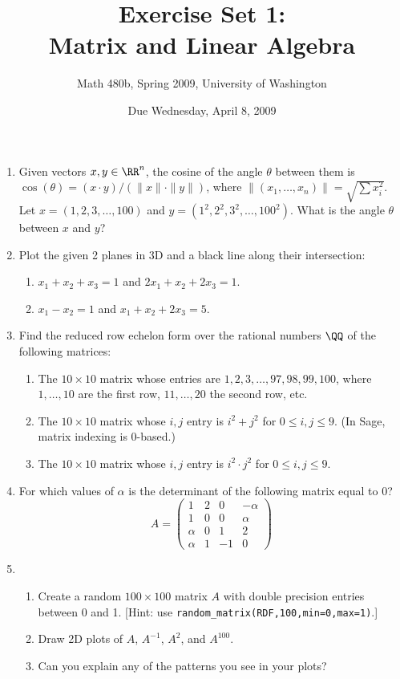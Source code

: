 \documentclass[11pt]{article}
\title{Exercise Set 1:\\Matrix and Linear Algebra}
\author{Math 480b, Spring 2009, University of Washington}
\date{Due Wednesday, April 8, 2009}
\begin{document}
\maketitle

\begin{enumerate}
\item Given vectors $x,y\in \RR^n$, the cosine of the angle $\theta$ between them is $\cos(\theta) = (x\cdot y)/(\|x\|\cdot \|y\|)$, 
where $\|(x_1,\ldots,x_n)\| = \sqrt{\sum x_i^2}$.  Let $x=(1,2,3,\ldots,100)$ and $y=(1^2,2^2,3^2,\ldots,100^2)$. What is the angle
$\theta$ between $x$ and $y$?

\item Plot the given 2 planes in 3D and a black line along their intersection:
\begin{enumerate}
\item $x_1+x_2+x_3 = 1$ and $2x_1 + x_2 + 2x_3 = 1$. 
\item $x_1 - x_2 = 1$ and $x_1 + x_2 + 2x_3 = 5$.
\end{enumerate}

\item Find the reduced row echelon form over the rational numbers $\QQ$ of the following matrices:
\begin{enumerate}
\item The $10\times10$ matrix whose entries are $1,2,3,\ldots,97,98,99,100$, where $1,\ldots,10$ are the first row, $11,\ldots,20$ the second row, etc.
\item The $10\times10$ matrix whose $i,j$ entry is $i^2 + j^2$ for $0\leq i,j \leq 9$.  (In Sage, matrix indexing is 0-based.)
\item The $10\times10$ matrix whose $i,j$ entry is $i^2 \cdot j^2$ for $0\leq i,j \leq 9$.

\end{enumerate}

\item   For which values of $\alpha$ is the determinant of the following matrix equal to $0$?
$$
A = \left(\begin{array}{rrrr}
1 & 2 & 0 & -\alpha \\
1 & 0 & 0 & \alpha \\
\alpha & 0 & 1 & 2 \\
\alpha & 1 & -1 & 0
\end{array}\right)
$$

\item
\begin{enumerate}
\item Create a random $100\times100$ matrix $A$ with double precision entries between 0 and 1. [Hint: use \texttt{random\_matrix(RDF,100,min=0,max=1)}.]
\item Draw 2D plots of $A$, $A^{-1}$, $A^2$, and $A^{100}$.
\item Can you explain any of the patterns you see in your plots?
\end{enumerate}


\end{enumerate}
\end{document}
